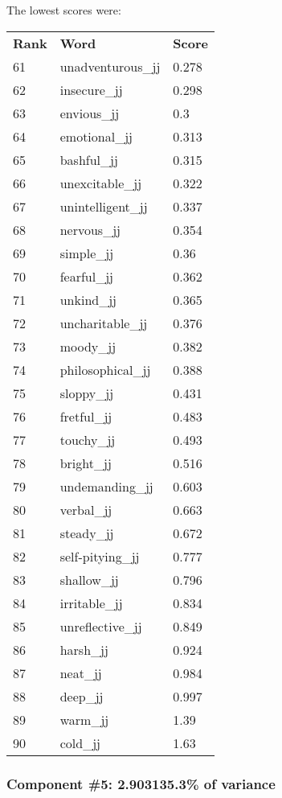 \documentclass[10pt,letterpaper]{book}
\begin{document}
The lowest scores were:
\begin{tabular}{ l l l }
        \textbf{Rank} & \textbf{Word} & \textbf{Score} \\
        61 & unadventurous\_jj & 0.278 \\
        62 & insecure\_jj & 0.298 \\
        63 & envious\_jj & 0.3 \\
        64 & emotional\_jj & 0.313 \\
        65 & bashful\_jj & 0.315 \\
        66 & unexcitable\_jj & 0.322 \\
        67 & unintelligent\_jj & 0.337 \\
        68 & nervous\_jj & 0.354 \\
        69 & simple\_jj & 0.36 \\
        70 & fearful\_jj & 0.362 \\
        71 & unkind\_jj & 0.365 \\
        72 & uncharitable\_jj & 0.376 \\
        73 & moody\_jj & 0.382 \\
        74 & philosophical\_jj & 0.388 \\
        75 & sloppy\_jj & 0.431 \\
        76 & fretful\_jj & 0.483 \\
        77 & touchy\_jj & 0.493 \\
        78 & bright\_jj & 0.516 \\
        79 & undemanding\_jj & 0.603 \\
        80 & verbal\_jj & 0.663 \\
        81 & steady\_jj & 0.672 \\
        82 & self-pitying\_jj & 0.777 \\
        83 & shallow\_jj & 0.796 \\
        84 & irritable\_jj & 0.834 \\
        85 & unreflective\_jj & 0.849 \\
        86 & harsh\_jj & 0.924 \\
        87 & neat\_jj & 0.984 \\
        88 & deep\_jj & 0.997 \\
        89 & warm\_jj & 1.39 \\
        90 & cold\_jj & 1.63 \\
\end{tabular}
\subsubsection{Component \#5: 2.903135.3\% of variance}
\end{document}
